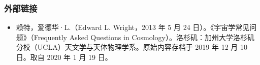 \subsubsection{外部链接}
\begin{itemize}
\item 赖特，爱德华·L.（Edward L. Wright，2013 年 5 月 24 日）。《宇宙学常见问题》（Frequently Asked Questions in Cosmology）。洛杉矶：加州大学洛杉矶分校（UCLA）天文学与天体物理学系。原始内容存档于 2019 年 12 月 10 日。取自 2020 年 1 月 19 日。
\end{itemize}




